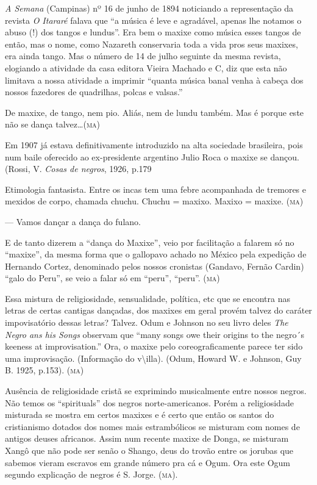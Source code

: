 \emph{A Semana} (Campinas) nº 16 de junho de 1894 noticiando a
representação da revista \emph{O Itararé} falava que ``a música é leve e
agradável, apenas lhe notamos o abuso (!) dos tangos e lundus''. Era bem
o maxixe como música esses tangos de então, mas o nome, como Nazareth
conservaria toda a vida pros seus maxixes, era ainda tango. Mas o número
de 14 de julho seguinte da mesma revista, elogiando a atividade da casa
editora Vieira Machado e C, diz que esta não limitava a nossa atividade
a imprimir ``quanta música banal venha à cabeça dos nossos fazedores de
quadrilhas, polcas e valsas.''

De maxixe, de tango, nem pio. Aliás, nem de lundu também. Mas é porque
este não se dança talvez\ldots{}(\textsc{ma})

Em 1907 já estava definitivamente introduzido na alta sociedade
brasileira, pois num baile oferecido ao ex-presidente argentino Julio
Roca o maxixe se dançou. (Rossi, V. \emph{Cosas de negros}, 1926, p.179

Etimologia fantasista. Entre os incas tem uma febre acompanhada de
tremores e mexidos de corpo, chamada chuchu. Chuchu = maxixo. Maxixo =
maxixe. (\textsc{ma})

--- Vamos dançar a dança do fulano.

E de tanto dizerem a ``dança do Maxixe'', veio por facilitação a falarem
só no ``maxixe'', da mesma forma que o gallopavo achado no México pela
expedição de Hernando Cortez, denominado pelos nossos cronistas
(Gandavo, Fernão Cardin) ``galo do Peru'', se veio a falar só em ``peru'',
``peru''. (\textsc{ma})

Essa mistura de religiosidade, sensualidade, política, etc que se
encontra nas letras de certas cantigas dançadas, dos maxixes em geral
provém talvez do caráter impovisatório dessas letras? Talvez. Odum e
Johnson no seu livro deles \emph{The Negro ans his Songs} observam que
``many songs owe their origins to the negro´s keeness at improvisation.''
Ora, o maxixe pelo coreograficamente parece ter sido uma improvisação.
(Informação do v\textbackslash{}illa). (Odum, Howard W. e Johnson, Guy
B. 1925, p.153). (\textsc{ma})

Ausência de religiosidade cristã se exprimindo musicalmente entre nossos
negros. Não temos os ``spirituals'' dos negros norte-americanos. Porém a
religiosidade misturada se mostra em certos maxixes e é certo que então
os santos do cristianismo dotados dos nomes mais estrambólicos se
misturam com nomes de antigos deuses africanos. Assim num recente maxixe
de Donga, se misturam Xangô que não pode ser senão o Shango, deus do
trovão entre os jorubas que sabemos vieram escravos em grande número pra
cá e Ogum. Ora este Ogum segundo explicação de negros é S. Jorge. (\textsc{ma}).

